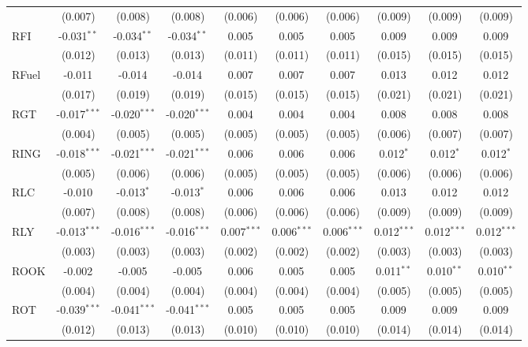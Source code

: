 \begin{table}[!htbp]
\begin{tabular}{@{\extracolsep{5pt}}lccccccccc}
  & (0.007) & (0.008) & (0.008) & (0.006) & (0.006) & (0.006) & (0.009) & (0.009) & (0.009) \\
 RFI & -0.031$^{**}$ & -0.034$^{**}$ & -0.034$^{**}$ & 0.005$^{}$ & 0.005$^{}$ & 0.005$^{}$ & 0.009$^{}$ & 0.009$^{}$ & 0.009$^{}$ \\
  & (0.012) & (0.013) & (0.013) & (0.011) & (0.011) & (0.011) & (0.015) & (0.015) & (0.015) \\
 RFuel & -0.011$^{}$ & -0.014$^{}$ & -0.014$^{}$ & 0.007$^{}$ & 0.007$^{}$ & 0.007$^{}$ & 0.013$^{}$ & 0.012$^{}$ & 0.012$^{}$ \\
  & (0.017) & (0.019) & (0.019) & (0.015) & (0.015) & (0.015) & (0.021) & (0.021) & (0.021) \\
 RGT & -0.017$^{***}$ & -0.020$^{***}$ & -0.020$^{***}$ & 0.004$^{}$ & 0.004$^{}$ & 0.004$^{}$ & 0.008$^{}$ & 0.008$^{}$ & 0.008$^{}$ \\
  & (0.004) & (0.005) & (0.005) & (0.005) & (0.005) & (0.005) & (0.006) & (0.007) & (0.007) \\
 RING & -0.018$^{***}$ & -0.021$^{***}$ & -0.021$^{***}$ & 0.006$^{}$ & 0.006$^{}$ & 0.006$^{}$ & 0.012$^{*}$ & 0.012$^{*}$ & 0.012$^{*}$ \\
  & (0.005) & (0.006) & (0.006) & (0.005) & (0.005) & (0.005) & (0.006) & (0.006) & (0.006) \\
 RLC & -0.010$^{}$ & -0.013$^{*}$ & -0.013$^{*}$ & 0.006$^{}$ & 0.006$^{}$ & 0.006$^{}$ & 0.013$^{}$ & 0.012$^{}$ & 0.012$^{}$ \\
  & (0.007) & (0.008) & (0.008) & (0.006) & (0.006) & (0.006) & (0.009) & (0.009) & (0.009) \\
 RLY & -0.013$^{***}$ & -0.016$^{***}$ & -0.016$^{***}$ & 0.007$^{***}$ & 0.006$^{***}$ & 0.006$^{***}$ & 0.012$^{***}$ & 0.012$^{***}$ & 0.012$^{***}$ \\
  & (0.003) & (0.003) & (0.003) & (0.002) & (0.002) & (0.002) & (0.003) & (0.003) & (0.003) \\
 ROOK & -0.002$^{}$ & -0.005$^{}$ & -0.005$^{}$ & 0.006$^{}$ & 0.005$^{}$ & 0.005$^{}$ & 0.011$^{**}$ & 0.010$^{**}$ & 0.010$^{**}$ \\
  & (0.004) & (0.004) & (0.004) & (0.004) & (0.004) & (0.004) & (0.005) & (0.005) & (0.005) \\
 ROT & -0.039$^{***}$ & -0.041$^{***}$ & -0.041$^{***}$ & 0.005$^{}$ & 0.005$^{}$ & 0.005$^{}$ & 0.009$^{}$ & 0.009$^{}$ & 0.009$^{}$ \\
  & (0.012) & (0.013) & (0.013) & (0.010) & (0.010) & (0.010) & (0.014) & (0.014) & (0.014) \\

\end{tabular}
\end{table}
